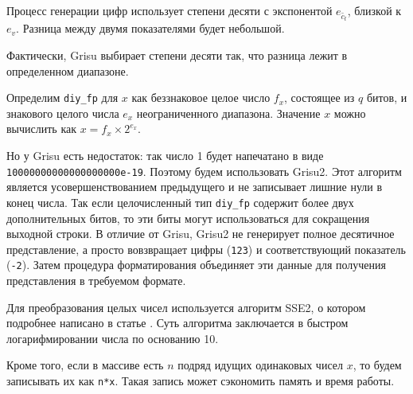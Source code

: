 \documentclass[a4paper, 12pt, twoside]{article}
\begin{document}
Процесс генерации цифр использует степени десяти с экспонентой $e_{\tilde{c_t}}$, близкой к $e_v$. 
Разница между двумя показателями будет небольшой.

Фактически, \textsf{Grisu} выбирает степени десяти так, что разница лежит в определенном диапазоне. 

Определим \texttt{diy\_fp} для $x$ как беззнаковое целое число $f_x$, состоящее из $q$ битов, и знакового целого числа $e_x$ неограниченного диапазона. 
Значение $x$ можно вычислить как $x= f_x \times 2^{e_x}$.

Но у \textsf{Grisu} есть недостаток: так число 1 будет напечатано в виде \\ \texttt{10000000000000000000e-19}.
Поэтому будем использовать \textsf{Grisu2}.
Этот алгоритм является усовершенствованием предыдущего и не записывает лишние нули в конец числа.
Так если целочисленный тип \texttt{diy\_fp} содержит более двух дополнительных битов, то эти биты могут использоваться для сокращения выходной строки.
В отличие от \textsf{Grisu}, \textsf{Grisu2} не генерирует полное десятичное представление, а просто вовзвращает цифры (\texttt{123}) и соответствующий показатель (\texttt{-2}). 
Затем процедура форматирования объединяет эти данные для получения представления в требуемом формате.


Для преобразования целых чисел используется алгоритм \textsf{SSE2}, о котором подробнее написано в статье \cite{2}.
Суть алгоритма заключается в быстром логарифмировании числа по основанию 10.

Кроме того, если в массиве есть $n$ подряд идущих одинаковых чисел $x$, то будем записывать их как \texttt{n*x}.
Такая запись может сэкономить память и время работы. 
\end{document}
